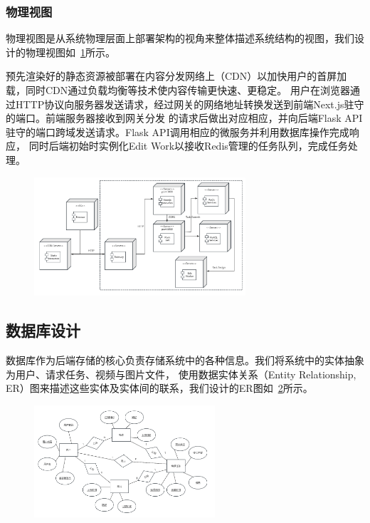 \subsubsection{物理视图}

物理视图是从系统物理层面上部署架构的视角来整体描述系统结构的视图，我们设计的物理视图如~\ref{fig:system-deploy}所示。

预先渲染好的静态资源被部署在内容分发网络上（CDN）以加快用户的首屏加载，同时CDN通过负载均衡等技术使内容传输更快速、更稳定。
用户在浏览器通过HTTP协议向服务器发送请求，经过网关的网络地址转换发送到前端Next.js驻守的端口。前端服务器接收到网关分发
的请求后做出对应相应，并向后端Flask API驻守的端口跨域发送请求。Flask API调用相应的微服务并利用数据库操作完成响应，
同时后端初始时实例化Edit Work以接收Redis管理的任务队列，完成任务处理。

\begin{figure}[ht]
    \centering
    \includegraphics[width=0.7\textwidth]{source/img/system_deploy.png}
    \label{fig:system-deploy}
\end{figure}

\subsection{数据库设计}

数据库作为后端存储的核心负责存储系统中的各种信息。我们将系统中的实体抽象为用户、请求任务、视频与图片文件，
使用数据实体关系（Entity Relationship, ER）图来描述这些实体及实体间的联系，我们设计的ER图如~\ref{fig:database-ER}所示。

\begin{figure}[ht]
    \centering
    \includegraphics[width=0.6\textwidth]{source/img/database_ER.png}
    \label{fig:database-ER}
\end{figure}

